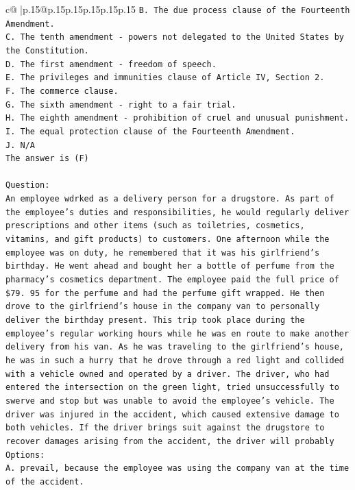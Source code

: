 \documentclass{article}
\begin{document}
{\begin{supertabular}{c@{$\;$}|p{.15\linewidth}@{}p{.15\linewidth}p{.15\linewidth}p{.15\linewidth}p{.15\linewidth}p{.15\linewidth}}
{{{\texttt{B. The due process clause of the Fourteenth Amendment.} \\
\texttt{C. The tenth amendment {-} powers not delegated to the United States by the Constitution.} \\
\texttt{D. The first amendment {-} freedom of speech.} \\
\texttt{E. The privileges and immunities clause of Article IV, Section 2.} \\
\texttt{F. The commerce clause.} \\
\texttt{G. The sixth amendment {-} right to a fair trial.} \\
\texttt{H. The eighth amendment {-} prohibition of cruel and unusual punishment.} \\
\texttt{I. The equal protection clause of the Fourteenth Amendment.} \\
\texttt{J. N/A} \\
\texttt{The answer is (F)} \\
\\ 
\texttt{Question:} \\
\texttt{An employee wdrked as a delivery person for a drugstore. As part of the employee's duties and responsibilities, he would regularly deliver prescriptions and other items (such as toiletries, cosmetics, vitamins, and gift products) to customers. One afternoon while the employee was on duty, he remembered that it was his girlfriend's birthday. He went ahead and bought her a bottle of perfume from the pharmacy's cosmetics department. The employee paid the full price of \$79. 95 for the perfume and had the perfume gift wrapped. He then drove to the girlfriend's house in the company van to personally deliver the birthday present. This trip took place during the employee's regular working hours while he was en route to make another delivery from his van. As he was traveling to the girlfriend's house, he was in such a hurry that he drove through a red light and collided with a vehicle owned and operated by a driver. The driver, who had entered the intersection on the green light, tried unsuccessfully to swerve and stop but was unable to avoid the employee's vehicle. The driver was injured in the accident, which caused extensive damage to both vehicles. If the driver brings suit against the drugstore to recover damages arising from the accident, the driver will probably} \\
\texttt{Options:} \\
\texttt{A. prevail, because the employee was using the company van at the time of the accident.} \\
}}}
\end{supertabular}}
\end{document}
